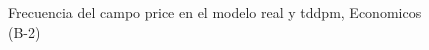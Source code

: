 \begin{figure}[H]
    \centering
    
    \caption{Frecuencia del campo  price en el modelo real y tddpm, Economicos (B-2)}
    \label{frecuency- Price-tddpm_mlp}
\end{figure}